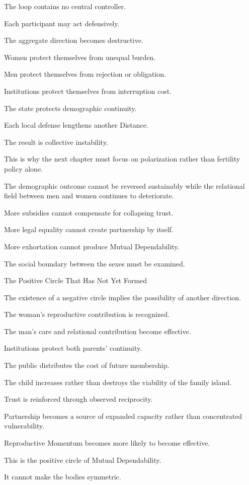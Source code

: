 The loop contains no central controller.

Each participant may act defensively.

The aggregate direction becomes destructive.

Women protect themselves from unequal burden.

Men protect themselves from rejection or obligation.

Institutions protect themselves from interruption cost.

The state protects demographic continuity.

Each local defense lengthens another Distance.

The result is collective instability.

This is why the next chapter must focus on polarization rather than fertility policy alone.

The demographic outcome cannot be reversed sustainably while the relational field between men and women continues to deteriorate.

More subsidies cannot compensate for collapsing trust.

More legal equality cannot create partnership by itself.

More exhortation cannot produce Mutual Dependability.

The social boundary between the sexes must be examined.

The Positive Circle That Has Not Yet Formed

The existence of a negative circle implies the possibility of another direction.

The woman’s reproductive contribution is recognized.

The man’s care and relational contribution become effective.

Institutions protect both parents’ continuity.

The public distributes the cost of future membership.

The child increases rather than destroys the viability of the family island.

Trust is reinforced through observed reciprocity.

Partnership becomes a source of expanded capacity rather than concentrated vulnerability.

Reproductive Momentum becomes more likely to become effective.

This is the positive circle of Mutual Dependability.

It cannot make the bodies symmetric.

